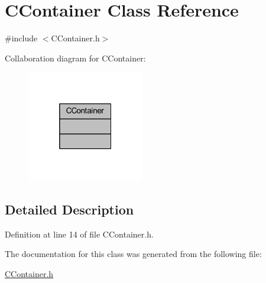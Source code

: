 \hypertarget{class_c_container}{}\section{C\+Container Class Reference}
\label{class_c_container}


{\ttfamily \#include $<$C\+Container.\+h$>$}



Collaboration diagram for C\+Container\+:\nopagebreak
\begin{figure}[H]
\begin{center}
\leavevmode
\includegraphics[width=145pt]{class_c_container__coll__graph}
\end{center}
\end{figure}


\subsection{Detailed Description}


Definition at line 14 of file C\+Container.\+h.



The documentation for this class was generated from the following file\+:\begin{DoxyCompactItemize}
\item 
\hyperlink{_c_container_8h}{C\+Container.\+h}\end{DoxyCompactItemize}
